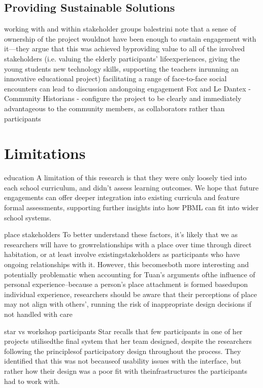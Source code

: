 \subsection{Providing Sustainable Solutions}
working with and within stakeholder groups
balestrini note that a sense of ownership of the project wouldnot have been enough to sustain engagement with it—they argue that this was achieved byproviding value to all of the involved stakeholders (i.e. valuing the elderly participants’ lifeexperiences, giving the young students new technology skills, supporting the teachers inrunning an innovative educational project)
 facilitating a range of face-to-face social encounters can lead to discussion andongoing engagement
 Fox and Le Dantex - Community Historians - configure the project to be clearly and immediately advantageous to the community members, as collaborators rather than participants

\section{Limitations}

education
A limitation of this research is that they were only loosely tied into each school curriculum, and didn't assess learning outcomes. We hope that future engagements can offer deeper integration into existing curricula and feature formal assessments, supporting further insights into how PBML can fit into wider school systems. 

place stakeholders
To better understand these factors, it’s likely that we as researchers will have to growrelationships with a place over time through direct habitation, or at least involve existingstakeholders as participants who have ongoing relationships with it. However, this becomesboth more interesting and potentially problematic when accounting for Tuan’s arguments ofthe influence of personal experience–because a person’s place attachment is formed basedupon individual experience, researchers should be aware that their perceptions of place may not align with others’, running the risk of inappropriate design decisions if not handled with care

star vs workshop participants
Star recalls that few participants in one of her projects utilisedthe final system that her team designed, despite the researchers following the principlesof participatory design throughout the process.  They identified that this was not becauseof usability issues with the interface, but rather how their design was a poor fit with theinfrastructures the participants had to work with. 

